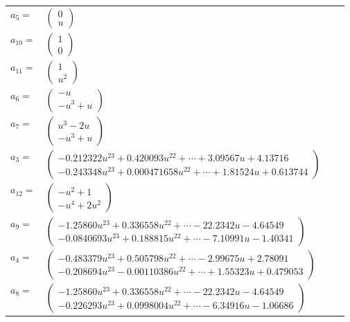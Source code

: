 \documentclass[1p]{elsarticle_modified}
\theoremstyle{definition}
\begin{document}
\begin{tabular}{m{7pt} m{180pt} m{7pt} m{180pt} }
\flushright $a_{5}=$&$\begin{pmatrix}0\\u\end{pmatrix}$ \\
\flushright $a_{10}=$&$\begin{pmatrix}1\\0\end{pmatrix}$ \\
\flushright $a_{11}=$&$\begin{pmatrix}1\\u^2\end{pmatrix}$ \\
\flushright $a_{6}=$&$\begin{pmatrix}- u\\- u^3+u\end{pmatrix}$ \\
\flushright $a_{7}=$&$\begin{pmatrix}u^3-2 u\\- u^3+u\end{pmatrix}$ \\
\flushright $a_{3}=$&$\begin{pmatrix}-0.212322 u^{23}+0.420093 u^{22}+\cdots+3.09567 u+4.13716\\-0.243348 u^{23}+0.000471658 u^{22}+\cdots+1.81524 u+0.613744\end{pmatrix}$ \\
\flushright $a_{12}=$&$\begin{pmatrix}- u^2+1\\- u^4+2 u^2\end{pmatrix}$ \\
\flushright $a_{9}=$&$\begin{pmatrix}-1.25860 u^{23}+0.336558 u^{22}+\cdots-22.2342 u-4.64549\\-0.0840693 u^{23}+0.188815 u^{22}+\cdots-7.10991 u-1.40341\end{pmatrix}$ \\
\flushright $a_{4}=$&$\begin{pmatrix}-0.483379 u^{23}+0.505798 u^{22}+\cdots-2.99675 u+2.78091\\-0.208694 u^{23}-0.00110386 u^{22}+\cdots+1.55323 u+0.479053\end{pmatrix}$ \\
\flushright $a_{8}=$&$\begin{pmatrix}-1.25860 u^{23}+0.336558 u^{22}+\cdots-22.2342 u-4.64549\\-0.226293 u^{23}+0.0998004 u^{22}+\cdots-6.34916 u-1.06686\end{pmatrix}$ \\

\end{tabular}
\end{document}
